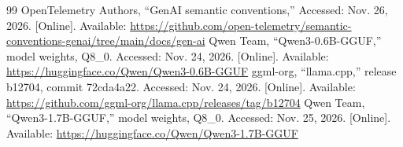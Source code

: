 \begin{thebibliography}{99}
 OpenTelemetry Authors, ``GenAI semantic conventions,'' Accessed: Nov. 26, 2026. [Online]. Available: \url{https://github.com/open-telemetry/semantic-conventions-genai/tree/main/docs/gen-ai}
 Qwen Team, ``Qwen3-0.6B-GGUF,'' model weights, Q8\_0. Accessed: Nov. 24, 2026. [Online]. Available: \url{https://huggingface.co/Qwen/Qwen3-0.6B-GGUF}
 ggml-org, ``llama.cpp,'' release b12704, commit 72cda4a22. Accessed: Nov. 24, 2026. [Online]. Available: \url{https://github.com/ggml-org/llama.cpp/releases/tag/b12704}
 Qwen Team, ``Qwen3-1.7B-GGUF,'' model weights, Q8\_0. Accessed: Nov. 25, 2026. [Online]. Available: \url{https://huggingface.co/Qwen/Qwen3-1.7B-GGUF}
\end{thebibliography}
